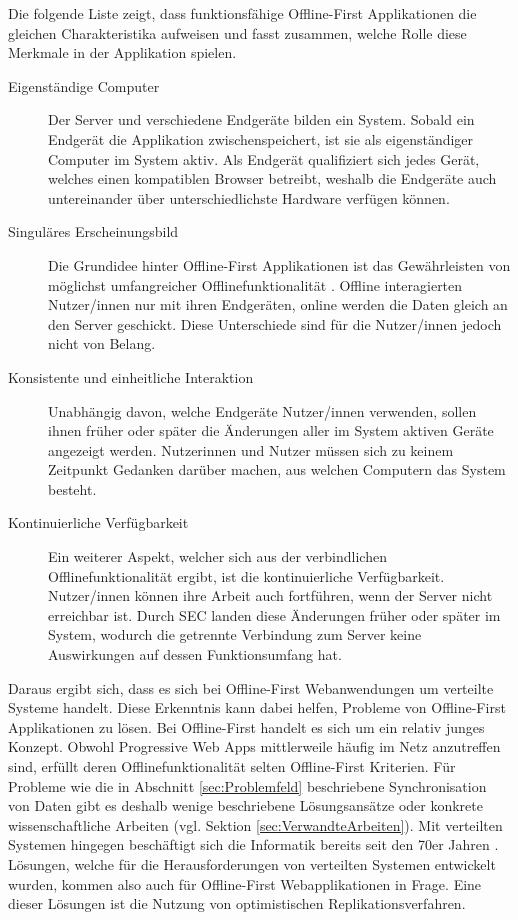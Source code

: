 \documentclass[a4paper, 12pt]{scrreprt}
\begin{document}
Die folgende Liste zeigt, dass funktionsfähige Offline-First Applikationen die gleichen Charakteristika aufweisen und fasst zusammen, welche Rolle diese Merkmale in der Applikation spielen.

\begin{description}		
\item[Eigenständige Computer] Der Server und verschiedene Endgeräte bilden ein System. Sobald ein Endgerät die Applikation zwischenspeichert, ist sie als eigenständiger Computer im System aktiv. Als Endgerät qualifiziert sich jedes Gerät, welches einen kompatiblen Browser betreibt, weshalb die Endgeräte auch untereinander über unterschiedlichste Hardware verfügen können.
\item[Singuläres Erscheinungsbild]Die Grundidee hinter Offline-First Applikationen ist das Gewährleisten von möglichst umfangreicher Offlinefunktionalität \autocite{OnlineGoogleOfflineFirst}. Offline interagierten Nutzer/innen nur mit ihren Endgeräten, online werden die Daten gleich an den Server geschickt. Diese Unterschiede sind für die Nutzer/innen jedoch nicht von Belang. \item[Konsistente und einheitliche Interaktion]
Unabhängig davon, welche Endgeräte Nutzer/innen verwenden, sollen ihnen früher oder später die Änderungen aller im System aktiven Geräte angezeigt werden. Nutzerinnen und Nutzer müssen sich zu keinem Zeitpunkt Gedanken darüber machen, aus welchen Computern das System besteht.
\item[Kontinuierliche Verfügbarkeit]
Ein weiterer Aspekt, welcher sich aus der verbindlichen Offlinefunktionalität ergibt, ist die kontinuierliche Verfügbarkeit. Nutzer/innen können ihre Arbeit auch fortführen, wenn der Server nicht erreichbar ist. Durch SEC landen diese Änderungen früher oder später im System, wodurch die getrennte Verbindung zum Server keine Auswirkungen auf dessen Funktionsumfang hat. 
\end{description}
\label{tab:charakteristikaOfflineFirst}

Daraus ergibt sich, dass es sich bei Offline-First Webanwendungen um verteilte Systeme handelt. Diese Erkenntnis kann dabei helfen, Probleme von Offline-First Applikationen zu lösen. Bei Offline-First handelt es sich um ein relativ junges Konzept. Obwohl Progressive Web Apps mittlerweile häufig im Netz anzutreffen sind, erfüllt deren Offlinefunktionalität selten Offline-First Kriterien. Für Probleme wie die in Abschnitt \ref{sec:Problemfeld} beschriebene Synchronisation von Daten gibt es deshalb wenige beschriebene Lösungsansätze oder konkrete wissenschaftliche Arbeiten (vgl. Sektion \ref{sec:VerwandteArbeiten}). Mit verteilten Systemen hingegen beschäftigt sich die Informatik bereits seit den 70er Jahren \autocite{Andrews1999FoundationsOM}. Lösungen, welche für die Herausforderungen von verteilten Systemen entwickelt wurden, kommen also auch für Offline-First Webapplikationen in Frage. Eine dieser Lösungen ist die Nutzung von optimistischen Replikationsverfahren. 
\end{document}
